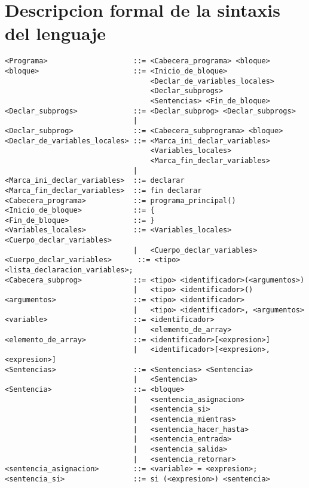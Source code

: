 \section{Descripcion formal de la sintaxis del lenguaje}

\begin{lstlisting}[breaklines=true, basicstyle=\tiny]
<Programa>                    ::= <Cabecera_programa> <bloque>
<bloque>                      ::= <Inicio_de_bloque>
                                  <Declar_de_variables_locales>
                                  <Declar_subprogs>
                                  <Sentencias> <Fin_de_bloque>
<Declar_subprogs>             ::= <Declar_subprog> <Declar_subprogs>
                              |
<Declar_subprog>              ::= <Cabecera_subprograma> <bloque>
<Declar_de_variables_locales> ::= <Marca_ini_declar_variables>
                                  <Variables_locales>
                                  <Marca_fin_declar_variables>
                              |
<Marca_ini_declar_variables>  ::= declarar
<Marca_fin_declar_variables>  ::= fin declarar
<Cabecera_programa>           ::= programa_principal()
<Inicio_de_bloque>            ::= {
<Fin_de_bloque>               ::= }
<Variables_locales>           ::= <Variables_locales> <Cuerpo_declar_variables>
                              |   <Cuerpo_declar_variables>
<Cuerpo_declar_variables>      ::= <tipo> <lista_declaracion_variables>;
<Cabecera_subprog>            ::= <tipo> <identificador>(<argumentos>)
                              |   <tipo> <identificador>()
<argumentos>                  ::= <tipo> <identificador>
                              |   <tipo> <identificador>, <argumentos>
<variable>                    ::= <identificador>
                              |   <elemento_de_array>
<elemento_de_array>           ::= <identificador>[<expresion>]
                              |   <identificador>[<expresion>, <expresion>]
<Sentencias>                  ::= <Sentencias> <Sentencia>
                              |   <Sentencia>
<Sentencia>                   ::= <bloque>
                              |   <sentencia_asignacion>
                              |   <sentencia_si>
                              |   <sentencia_mientras>
                              |   <sentencia_hacer_hasta>
                              |   <sentencia_entrada>
                              |   <sentencia_salida>
                              |   <sentencia_retornar>
<sentencia_asignacion>        ::= <variable> = <expresion>;
<sentencia_si>                ::= si (<expresion>) <sentencia>

\end{lstlisting}
